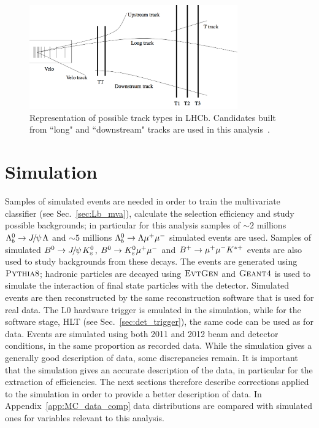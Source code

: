 \begin{figure}[hbt]
\centering
\includegraphics[width=0.8\textwidth,trim=0cm 0cm 0cm 5mm,]{Lmumu/figs/track_types.png}
\caption{Representation of possible track types in LHCb. Candidates built from ``long" and 
``downstream" tracks are used in this analysis~\cite{Alves:2008zz}.}
\label{fig:track_types}
\end{figure}
 
\section{Simulation}
\label{sec:Lb_simulation}

Samples of simulated events are needed in order to train the multivariate classifier
(see Sec.~\ref{sec:Lb_mva}), calculate the selection efficiency and study possible backgrounds;
in particular for this analysis samples of $\sim 2$ millions $\Lb\to\jpsi\Lz$ and 
$\sim 5$ millions ${{\Lambda}^0_{b}}\rightarrow{\ensuremath{\Lambda}}{\ensuremath{\mu^+\mu^-}}$ simulated events are used.
Samples of simulated $\Bz\ra\jpsi\KS$, ${{B}^0}\rightarrow{\ensuremath{{K}^0_{\rm\scriptscriptstyle S}}}{\ensuremath{\mu^+\mu^-}}$ and $B^{+} \rightarrow{\ensuremath{\mu^+\mu^-}} K^{*+}$
events are also used to study backgrounds from these decays. The events are generated using
$\textsc{Pythia}8$; hadronic particles are decayed using $\textsc{EvtGen}$ and $\textsc{Geant4}$ is used to simulate
the interaction of final state particles with the detector. Simulated events are then
reconstructed by the same reconstruction software that is used for real data. The L0 hardware
trigger is emulated in the simulation, while for the software stage, HLT
(see Sec.~\ref{sec:det_trigger}), the same code can be used as for data.
Events are simulated using both 2011 and 2012 beam and detector conditions, in the same proportion as
recorded data. While the simulation gives a generally good description of data, some discrepancies remain.
It is important that the simulation gives an accurate description of the data, 
in particular for the extraction of efficiencies. The next sections therefore 
describe corrections applied to the simulation in order to provide a better description of data.
In Appendix~\ref{app:MC_data_comp} data distributions are compared with simulated ones for
variables relevant to this analysis.

